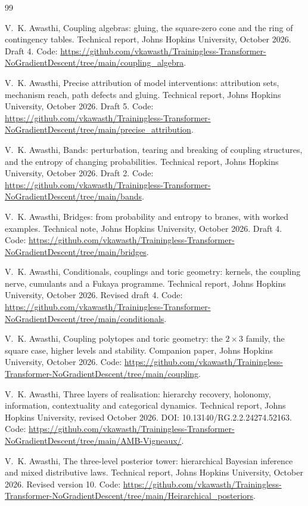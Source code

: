 \documentclass[11pt]{article}
\theoremstyle{definition}
\theoremstyle{remark}
\begin{document}
\begin{thebibliography}{99}

V.~K. Awasthi, Coupling algebras: gluing, the square-zero cone and the ring of contingency tables. Technical report, Johns
Hopkins University, October 2026. Draft 4. Code: \url{https://github.com/vkawasth/Trainingless-Transformer-NoGradientDescent/tree/main/coupling_algebra}.

V.~K. Awasthi, Precise attribution of model interventions: attribution sets, mechanism reach, path defects and gluing.
Technical report, Johns Hopkins University, October 2026. Draft 5. Code: \url{https://github.com/vkawasth/Trainingless-Transformer-NoGradientDescent/tree/main/precise_attribution}.

V.~K. Awasthi, Bands: perturbation, tearing and breaking of coupling structures, and the entropy of changing probabilities.
Technical report, Johns Hopkins University, October 2026. Draft 2. Code: \url{https://github.com/vkawasth/Trainingless-Transformer-NoGradientDescent/tree/main/bands}.

V.~K. Awasthi, Bridges: from probability and entropy to branes, with worked examples. Technical note, Johns Hopkins University,
October 2026. Draft 4. Code: \url{https://github.com/vkawasth/Trainingless-Transformer-NoGradientDescent/tree/main/bridges}.

V.~K. Awasthi, Conditionals, couplings and toric geometry: kernels, the coupling nerve, cumulants and a {F}ukaya
programme. Technical report, Johns Hopkins University, October 2026. Revised draft 4. Code: \url{https://github.com/vkawasth/Trainingless-Transformer-NoGradientDescent/tree/main/conditionals}.

V.~K. Awasthi, Coupling polytopes and toric geometry: the $2\times3$ family, the square case, higher levels and stability.
Companion paper, Johns Hopkins University, October 2026. Code: \url{https://github.com/vkawasth/Trainingless-Transformer-NoGradientDescent/tree/main/coupling}.

V.~K. Awasthi, Three layers of realisation: hierarchy recovery, holonomy, information, contextuality and categorical
dynamics. Technical report, Johns Hopkins University, revised October 2026. DOI: 10.13140/RG.2.2.24274.52163. Code: \url{https://github.com/vkawasth/Trainingless-Transformer-NoGradientDescent/tree/main/AMB-Vigneaux/}.

V.~K. Awasthi, The three-level posterior tower: hierarchical {B}ayesian inference and mixed distributive laws.
Technical report, Johns Hopkins University, October 2026. Revised version 10. Code: \url{https://github.com/vkawasth/Trainingless-Transformer-NoGradientDescent/tree/main/Heirarchical_posteriors}.


\end{thebibliography}
\end{document}
